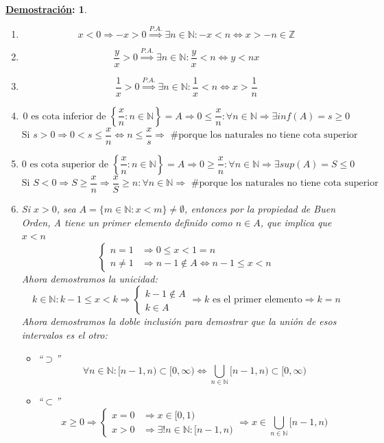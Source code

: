 \documentclass[10pt,a4paper,openright]{book}
\theoremstyle{break}
\newtheorem*{demo}{\underline{Demostración}:}
\begin{document}
\begin{demo}
\begin{enumerate}
\item $$x<0\Rightarrow -x>0\stackrel{P.A.}{\Rightarrow} \exists n \in \mathbb N: -x<n\Leftrightarrow x>-n\in \mathbb Z$$
\item $$\frac{y}{x}>0\stackrel{P.A.}{\Rightarrow} \exists n \in \mathbb N : \frac{y}{x}<n \Leftrightarrow y<nx$$
\item $$\frac{1}{x}>0\stackrel{P.A.}{\Rightarrow }\exists n \in \mathbb N : \frac{1}{x}<n\Leftrightarrow x>\frac{1}{n}$$			
\item $$\mbox{0 es cota inferior de } \left\lbrace\frac{x}{n}: n\in \mathbb N\right\rbrace=A\Rightarrow 0\leq \frac{x}{n}: \forall n\in \mathbb N \Rightarrow \exists inf(A)=s\geq 0$$
$$\mbox{Si }s>0\Rightarrow 0<s\leq \frac{x}{n}\Leftrightarrow n\leq \frac{x}{s}\Rightarrow \mbox{ \# porque los naturales no tiene cota superior}$$
\item $$\mbox{0 es cota superior de } \left\lbrace\frac{x}{n}: n\in \mathbb N\right\rbrace=A\Rightarrow 0\geq \frac{x}{n}: \forall n\in \mathbb N\Rightarrow \exists sup(A)=S \leq 0$$
$$\mbox{Si }S<0\Rightarrow S\geq \frac{x}{n}\Rightarrow \frac{x}{S}\geq n: \forall n \in \mathbb N\Rightarrow \mbox{ \# porque los naturales no tiene cota superior}$$
\item Si $x>0$, sea $A=\{m\in \mathbb N: x<m\}\neq \emptyset$, entonces por la propiedad de Buen Orden, A tiene un primer elemento definido como $n\in A$, que implica que $x<n$
$$\begin{cases}n=1 &\Rightarrow 0\leq x<1=n\\
n\neq 1 &\Rightarrow n-1\notin A\Leftrightarrow n-1\leq x< n\end{cases}$$
Ahora demostramos la unicidad:
$$k\in \mathbb N: k-1\leq x<k\Rightarrow \begin{cases}k-1 \notin A \\ k \in A\end{cases}\Rightarrow k \mbox{ es el primer elemento}\Rightarrow k=n$$
Ahora demostramos la doble inclusión para demostrar que la unión de esos intervalos es el otro:
	\begin{itemize}
	\item ``$\supset$''
	$$\forall n \in \mathbb N: [n-1,n)\subset [0,\infty)\Leftrightarrow \bigcup_{n\in \mathbb N}[n-1,n) \subset [0,\infty)$$
	
	\item ``$\subset$''
	$$x\geq 0\Rightarrow \begin{cases} x=0 & \Rightarrow x\in [0,1) \\ x>0 & \Rightarrow \exists! n \in \mathbb N : [n-1,n)	
	\end{cases}\Rightarrow x\in \bigcup_{n\in \mathbb N}[n-1,n) $$
	\end{itemize}


\end{enumerate}
\end{demo}
\end{document}
